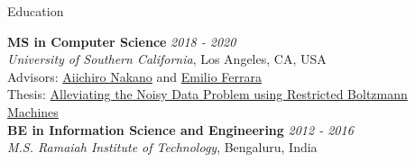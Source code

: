 \documentclass{resume} %
\begin{document}
\begin{rSection}{Education}

{\bf MS in Computer Science} \hfill {\em 2018 - 2020} \\ 
{\it University of Southern California}, Los Angeles, CA, USA \\
Advisors: \href{http://cacs.usc.edu/people/nakano.php}{Aiichiro Nakano} and \href{http://www.emilio.ferrara.name/}{Emilio Ferrara} \\
Thesis: \href{http://digitallibrary.usc.edu/cdm/compoundobject/collection/p15799coll89/id/367418/rec/71}{Alleviating the Noisy Data Problem using Restricted Boltzmann Machines} \\

{\bf BE in Information Science and Engineering} \hfill {\em 2012 - 2016} \\
{\it M.S. Ramaiah Institute of Technology}, Bengaluru, India \\

\end{rSection}
\end{document}
